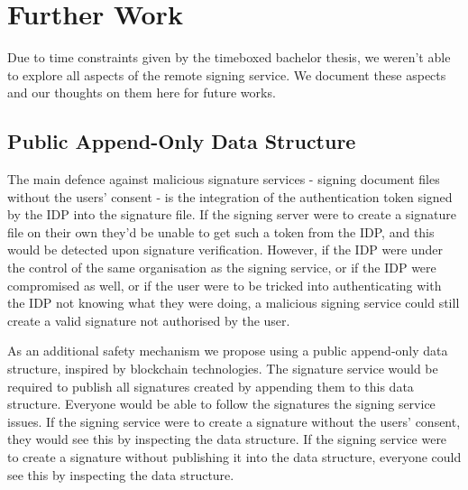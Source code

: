 \chapter{Further Work}\label{ch:further-work}
Due to time constraints given by the timeboxed bachelor thesis, we weren't able to explore all aspects of the remote signing service.
We document these aspects and our thoughts on them here for future works.

\section{Public Append-Only Data Structure}\label{sec:public-append-only-data-structure}
The main defence against malicious signature services - signing document files without the users' consent - is the integration of the authentication token signed by the \gls{IDP} into the signature file.
If the signing server were to create a signature file on their own they'd be unable to get such a token from the \gls{IDP}, and this would be detected upon signature verification.
However, if the \gls{IDP} were under the control of the same organisation as the signing service,
or if the \gls{IDP} were compromised as well,
or if the user were to be tricked into authenticating with the \gls{IDP} not knowing what they were doing,
a malicious signing service could still create a valid signature not authorised by the user.

As an additional safety mechanism we propose using a public append-only data structure, inspired by blockchain technologies.
The signature service would be required to publish all signatures created by appending them to this data structure.
Everyone would be able to follow the signatures the signing service issues.
If the signing service were to create a signature without the users' consent, they would see this by inspecting the data structure.
If the signing service were to create a signature without publishing it into the data structure, everyone could see this by inspecting the data structure.

